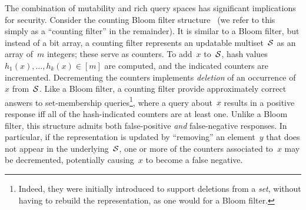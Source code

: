 The combination of mutability and rich query spaces has significant implications
for security. Consider the counting Bloom filter
structure~\cite{fan2000summary} (we refer to this simply as a ``counting
filter'' in the remainder).  It is similar to a Bloom filter, but 
instead of a bit array, a counting filter represents an updatable
multiset~$\mathcal{S}$ as an array of~$m$ integers; these serve as counters.
To add~$x$ to~$\mathcal{S}$, hash values $h_1(x), \ldots,
h_k(x)\in[m]$ are computed, and the indicated counters are
incremented.  Decrementing the counters implements \emph{deletion} of
an occurrence of~$x$ from~$\mathcal{S}$. %
%
Like a Bloom filter, a counting filter provide approximately correct
answers to set-membership queries\footnote{Indeed, they were initially
introduced to support deletions from a \emph{set}, without having to
rebuild the representation, as one would for a Bloom filter.}, where a
query about~$x$ results in a positive response iff all of the
hash-indicated counters are at least one.
%
%
%
Unlike a Bloom filter, this structure admits both false-positive \emph{and} false-negative responses.
In particular, if the representation is updated by ``removing'' an element~$y$
that does not appear in the underlying~$\mathcal{S}$, one or more of the counters
associated to~$x$ may be decremented, potentially causing~$x$ to become a false
negative.


